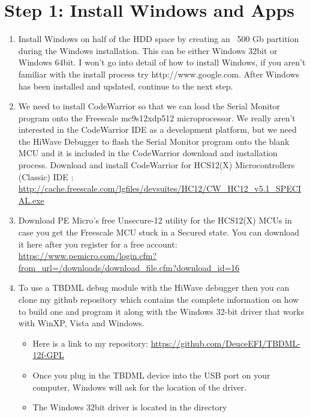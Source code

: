 \documentclass[12pt,notitlepage,onecolumn,oneside,openany]{memoir}
\begin{document}
\chapter{\textsf{Step 1:  Install Windows and Apps}}
\begin{enumerate}
\item \textsf{Install Windows on half of the HDD space by creating an ~500 Gb partition during the Windows installation.}
\textsf{This can be either Windows 32bit or Windows 64bit.  I won't go into detail of how to install Windows, if you aren't familiar with the install process try http://www.google.com.  After Windows has been installed and updated, continue to the next step.}

\item \textsf{We need to install CodeWarrior so that we can load the Serial Monitor program onto the Freescale mc9s12xdp512 microprocessor.  We really aren't interested in the CodeWarrior IDE as a development platform, but we need the HiWave Debugger to flash the Serial Monitor program onto the blank MCU and it is included in the CodeWarrior download and installation process.}\newline
      \textsf{Download and install CodeWarrior for HCS12(X) Microcontrollers (Classic) IDE :} \newline
      \url{http://cache.freescale.com/lgfiles/devsuites/HC12/CW_HC12_v5.1_SPECIAL.exe}

\item \textsf{Download PE Micro's free Unsecure-12 utility for the HCS12(X) MCUs in case you get the Freescale MCU stuck in a Secured state. You can download it here after you register for a free account:} \newline
\url{https://www.pemicro.com/login.cfm?from_url=/downloads/download_file.cfm?download_id=16}

\item \textsf{To use a TBDML debug module with the HiWave debugger then you can clone my github repository which contains the complete information on how to build one and program it along with the Windows 32-bit driver that works with WinXP, Vista and Windows.} 
\begin{itemize}
      \item \textsf{Here is a link to my repository:} \newline
            \url{https://github.com/DeuceEFI/TBDML-12f-GPL}
      \item \textsf{Once you plug in the TBDML device into the USB port on your computer, Windows will ask for the location of the driver.} 
      \item \textsf{The Windows 32bit driver is located in the  directory}  
\end{itemize}


\end{enumerate}
\end{document}
